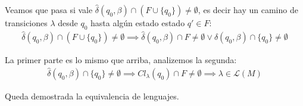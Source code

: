 \begin{itemize}
\begin{itemize}
                Veamos que pasa si vale \(\hat\delta(q_0,\beta)\cap(F\cup\{q_0\}) \neq \emptyset\), es decir hay un camino de  transiciones \(\lambda\) desde \(q_0\) hasta algún estado estado \(q'\in F\):
                \begin{align*}
                  \hat\delta(q_0,\beta)\cap(F\cup\{q_0\}) \neq \emptyset \implies \hat\delta(q_0,\beta)\cap F \neq \emptyset \lor \hat\delta(q_0,\beta)\cap\{q_0\} \neq \emptyset
                \end{align*}

                La primer parte es lo mismo que arriba, analizemos la segunda:
                \begin{align*}
                  \hat\delta(q_0,\beta)\cap\{q_0\} \neq \emptyset \implies Cl_\lambda(q_0)\cap F \neq \emptyset \implies \lambda\in \mathcal{L}(M)
                \end{align*}
        \end{itemize}
\end{itemize}
Queda demostrada la equivalencia de lenguajes.
